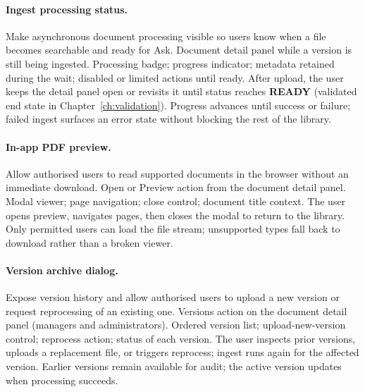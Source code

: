 \paragraph{Ingest processing status.}
\uiexplain
{Make asynchronous document processing visible so users know when a file becomes
searchable and ready for Ask.}
{Document detail panel while a version is still being ingested.}
{Processing badge; progress indicator; metadata retained during the wait;
disabled or limited actions until ready.}
{After upload, the user keeps the detail panel open or revisits it until status
reaches \textbf{READY} (validated end state in Chapter~\ref{ch:validation}).}
{Progress advances until success or failure; failed ingest surfaces an error
state without blocking the rest of the library.}

\paragraph{In-app PDF preview.}
\uiexplain
{Allow authorised users to read supported documents in the browser without an
immediate download.}
{Open or Preview action from the document detail panel.}
{Modal viewer; page navigation; close control; document title context.}
{The user opens preview, navigates pages, then closes the modal to return to the
library.}
{Only permitted users can load the file stream; unsupported types fall back to
download rather than a broken viewer.}

\paragraph{Version archive dialog.}
\uiexplain
{Expose version history and allow authorised users to upload a new version or
request reprocessing of an existing one.}
{Versions action on the document detail panel (managers and administrators).}
{Ordered version list; upload-new-version control; reprocess action; status of
each version.}
{The user inspects prior versions, uploads a replacement file, or triggers
reprocess; ingest runs again for the affected version.}
{Earlier versions remain available for audit; the active version updates when
processing succeeds.}
